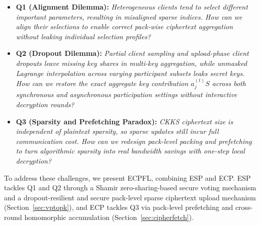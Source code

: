 \begin{itemize}
\item \textbf{Q1 (Alignment Dilemma):} \emph{Heterogeneous clients tend to select different important parameters, resulting in misaligned sparse indices. How can we align their selections to enable correct pack-wise ciphertext aggregation without leaking individual selection profiles?}

\item \textbf{Q2 (Dropout Dilemma):} \emph{Partial client sampling and upload-phase client dropouts leave missing key shares in multi-key aggregation, while unmasked Lagrange interpolation across varying participant subsets leaks secret keys. How can we restore the exact aggregate key contribution $a_j^{(t)}S$ across both synchronous and asynchronous participation settings without interactive decryption rounds?}

\item \textbf{Q3 (Sparsity and Prefetching Paradox):} \emph{CKKS ciphertext size is independent of plaintext sparsity, so sparse updates still incur full communication cost. How can we redesign pack-level packing and prefetching to turn algorithmic sparsity into real bandwidth savings with one-step local decryption?}
\end{itemize}

To address these challenges, we present \textsc{ECPFL}, combining ESP and ECP. ESP tackles Q1 and Q2 through a Shamir zero-sharing-based secure voting mechanism and a dropout-resilient and secure pack-level sparse ciphertext upload mechanism (Section~\ref{sec:vptopk}), and ECP tackles Q3 via pack-level prefetching and cross-round homomorphic accumulation (Section~\ref{sec:cipherfetch}).
